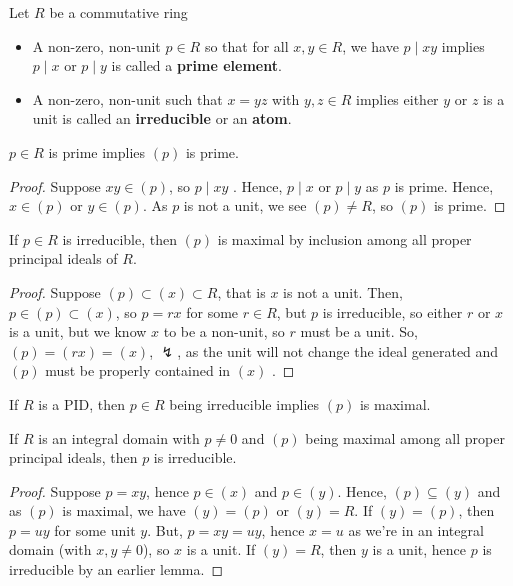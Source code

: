 \begin{definition}[Factorization]
Let \(R\) be a commutative ring
\begin{itemize}
	\item A non-zero, non-unit \(p \in R\) so that for all \(x, y \in R\), we have \(p \mid xy\) implies \(p \mid x\) or \(p \mid y\) is called a \textbf{prime element}.
	\item A non-zero, non-unit such that \(x = yz\) with \(y, z \in R\) implies either \(y\) or \(z\) is a unit is called an \textbf{irreducible} or an \textbf{atom}.
\end{itemize}
\end{definition}
\begin{proposition}
	\(p \in R\) is prime implies \(\left( p \right) \) is prime.
\end{proposition}
\begin{proof}
	Suppose \(xy \in \left( p \right) \), so \(p \mid xy\) . Hence, \(p \mid x\) or \(p \mid y\) as \(p\) is prime. Hence, \( x \in \left( p \right) \) or \(y \in \left( p \right) \). As \(p\) is not a unit, we see \(\left( p \right) \neq R\), so \(\left( p \right) \) is prime.
\end{proof}
\begin{proposition}
	If \(p \in R\) is irreducible, then \(\left( p \right) \) is maximal by inclusion among all proper principal ideals of \(R\).
\end{proposition}
\begin{proof}
	Suppose \(\left( p \right) \subset \left( x \right) \subset R\), that is \(x\) is not a unit. Then, \(p \in \left( p \right) \subset \left( x \right) \), so \(p = rx\) for some \(r \in R\), but \(p\) is irreducible, so either \(r\) or \(x\) is a unit, but we know \(x\) to be a non-unit, so \(r\) must be a unit. So, \(\left( p \right)  = \left( rx \right) = \left( x \right) \), \(\lightning\),  as the unit will not change the ideal generated and \(\left( p \right) \) must be properly contained in \(\left(x  \right) \) .
\end{proof}
\begin{corollary}
	If \(R\) is a PID, then \(p \in R\) being irreducible implies \(\left( p \right) \) is maximal.
\end{corollary}
\begin{proposition}
	If \(R\) is an integral domain with \(p \neq 0\) and \(\left( p \right) \) being maximal among all proper principal ideals, then \(p\) is irreducible.
\end{proposition}
\begin{proof}
	Suppose \( p = xy\), hence \(p \in \left( x \right) \) and \(p \in \left( y \right) \). Hence, \( \left( p \right) \subseteq \left( y \right) \) and as \(\left( p \right) \) is maximal, we have \(\left( y \right)  = \left( p \right) \) or \(\left( y \right)  = R\). If \(\left( y \right) = \left( p \right) \), then \( p = uy\) for some unit \(y\). But, \(p = xy = uy\), hence \(x = u\) as we're in an integral domain (with \(x, y \neq 0\)), so \(x\) is a unit. If \(\left( y \right)  = R\), then \(y\) is a unit, hence \(p\) is irreducible by an earlier lemma.
\end{proof}

